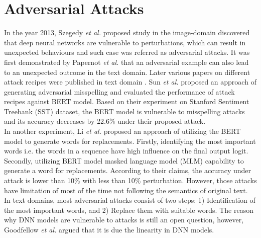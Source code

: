 \documentclass[%
	BCOR=8mm, %
	DIV=12,
	toc=bibliography, %
	toc=listof, %
	oneside, %
	egregdoesnotlikesansseriftitles, %
	]{scrbook}
\begin{document}
\section{Adversarial Attacks}
\label{section:advattacks}
In the year 2013, Szegedy \textit{et al.} \cite{szegedy_intriguing_2014} proposed study in the image-domain discovered that deep neural networks are vulnerable to perturbations, which can result in unexpected behaviours and such case was referred as adversarial attacks. It was first demonstrated by Papernot \textit{et al.}  \cite{papernot_crafting_2016} that an adversarial example can also lead to an unexpected outcome in the text domain. Later various papers on different attack recipes were published in text domain \cite{alzantot_generating_2018,li_bert-attack_2020,gao_black-box_2018,li_bert-attack_2020,ren_generating_2019,garg_bae_2020,chen_robustness_2019}.  Sun \textit{et al.}  \cite{sun_adv-bert_2020} proposed an approach of  generating adversarial misspelling and evaluated the performance of  attack recipes  against BERT model. Based on their experiment on Stanford Sentiment Treebank (SST) dataset, the BERT model is vulnerable to misspelling attacks and its accuracy decreases by 22.6\% under their proposed attack.\\
In another experiment, Li \textit{et al.} \cite{li_bert-attack_2020} proposed an approach of utilizing the BERT model to generate words for replacements. Firstly, identifying the most important words i.e. the words in a sequence have high influence on the final output logit. Secondly, utilizing BERT model masked language model (MLM) capability to generate a word for replacements. According to their claims, the accuracy under attack is lower than 10\% with less than 10\% perturbation. However, those attacks have limitation of most of the time not following the semantics of original text. \\
In text domains, most adversarial attacks consist of two steps: 1) Identification of the most important words, and 2) Replace them with suitable words. The reason why DNN models are vulnerable to attacks is still an open question, however, Goodfellow \textit{et al.} \cite{goodfellow_explaining_2015} argued that it is due the linearity in DNN models.
\end{document}

